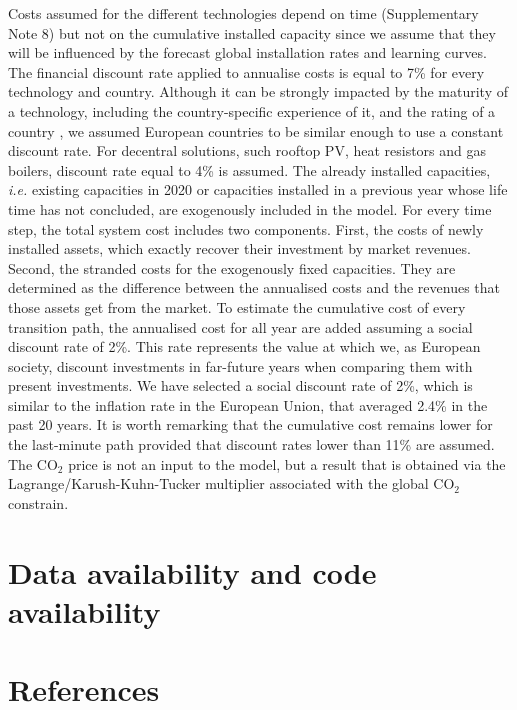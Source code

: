 \documentclass[5p]{elsarticle} %
\begin{document}
Costs assumed for the different technologies depend on time (Supplementary Note 8) but not on the cumulative installed capacity since we assume that they will be influenced by the forecast global installation rates and learning curves. The financial discount rate applied to annualise costs is equal to 7\% for every technology and country. Although it can be strongly impacted by the maturity of a technology, including the country-specific experience of it, and the rating of a country \cite{Egli_2019}, we assumed European countries to be similar enough to use a constant discount rate. For decentral solutions, such rooftop PV, heat resistors and gas boilers, discount rate equal to 4\% is assumed. The already installed capacities, \textit{i.e.} existing capacities in 2020 or capacities installed in a previous year whose life time has not concluded, are exogenously included in the model. For every time step, the total system cost includes two components. First, the costs of newly installed assets, which exactly recover their investment by market revenues. Second, the stranded costs for the exogenously fixed capacities. They are determined as the difference between the annualised costs and the revenues that those assets get from the market.  To estimate the cumulative cost of every transition path, the annualised cost for all year are added assuming a social discount rate of 2\%. This rate represents the value at which we, as European society, discount investments in far-future years when comparing them with present investments. We have selected a social discount rate of 2\%, which is similar to the inflation rate in the European Union, that averaged 2.4\% in the past 20 years. It is worth remarking that the cumulative cost remains lower for the last-minute path provided that discount rates lower than 11\% are assumed. The CO$_2$ price is not an input to the model, but a result that is obtained via the Lagrange/Karush-Kuhn-Tucker multiplier associated with the global CO$_2$ constrain. 

\section{Data availability and code availability}

\section{References}

\end{document}
